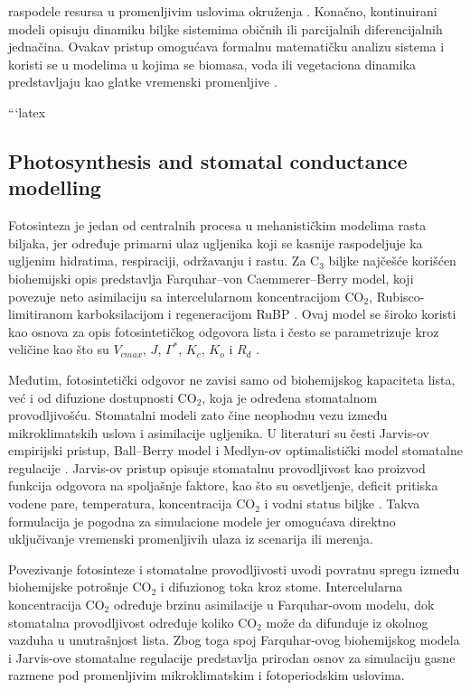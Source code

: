 \documentclass[a4paper,fleqn]{cas-dc}
\begin{document}
raspodele resursa u promenljivim uslovima okruženja \cite{Russo2022}. Konačno, kontinuirani modeli opisuju dinamiku biljke sistemima običnih ili parcijalnih diferencijalnih jednačina. Ovakav pristup omogućava formalnu matematičku analizu sistema i koristi se u modelima u kojima se biomasa, voda ili vegetaciona dinamika predstavljaju kao glatke vremenski promenljive \cite{Meron2019}.


```latex
\subsection{Photosynthesis and stomatal conductance modelling}

Fotosinteza je jedan od centralnih procesa u mehanističkim modelima rasta biljaka, jer određuje primarni ulaz ugljenika koji se kasnije raspodeljuje ka ugljenim hidratima, respiraciji, održavanju i rastu. Za C$_3$ biljke najčešće korišćen biohemijski opis predstavlja Farquhar--von Caemmerer--Berry model, koji povezuje neto asimilaciju sa intercelularnom koncentracijom CO$_2$, Rubisco-limitiranom karboksilacijom i regeneracijom RuBP \cite{Farquhar1980}. Ovaj model se široko koristi kao osnova za opis fotosintetičkog odgovora lista i često se parametrizuje kroz veličine kao što su $V_{cmax}$, $J$, $\Gamma^*$, $K_c$, $K_o$ i $R_d$ \cite{Sharkey2007,Dubois2007}.

Međutim, fotosintetički odgovor ne zavisi samo od biohemijskog kapaciteta lista, već i od difuzione dostupnosti CO$_2$, koja je određena stomatalnom provodljivošću. Stomatalni modeli zato čine neophodnu vezu između mikroklimatskih uslova i asimilacije ugljenika. U literaturi su česti Jarvis-ov empirijski pristup, Ball--Berry model i Medlyn-ov optimalistički model stomatalne regulacije \cite{Jarvis1976,Ball1987,Medlyn2011}. Jarvis-ov pristup opisuje stomatalnu provodljivost kao proizvod funkcija odgovora na spoljašnje faktore, kao što su osvetljenje, deficit pritiska vodene pare, temperatura, koncentracija CO$_2$ i vodni status biljke \cite{Jarvis1976,YU2017,Yu2021}. Takva formulacija je pogodna za simulacione modele jer omogućava direktno uključivanje vremenski promenljivih ulaza iz scenarija ili merenja.

Povezivanje fotosinteze i stomatalne provodljivosti uvodi povratnu spregu između biohemijske potrošnje CO$_2$ i difuzionog toka kroz stome. Intercelularna koncentracija CO$_2$ određuje brzinu asimilacije u Farquhar-ovom modelu, dok stomatalna provodljivost određuje koliko CO$_2$ može da difunduje iz okolnog vazduha u unutrašnjost lista. Zbog toga spoj Farquhar-ovog biohemijskog modela i Jarvis-ove stomatalne regulacije predstavlja prirodan osnov za simulaciju gasne razmene pod promenljivim mikroklimatskim i fotoperiodskim uslovima.
\end{document}
